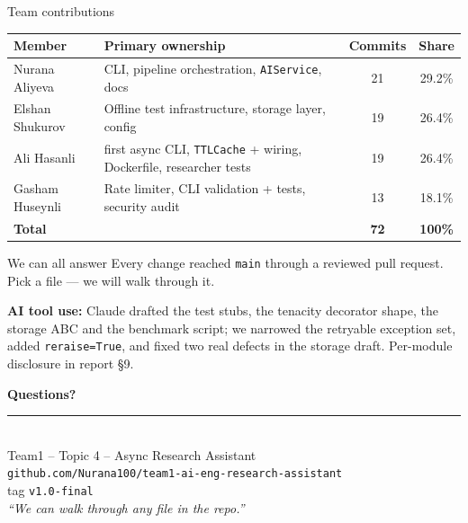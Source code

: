 \documentclass[aspectratio=169,11pt]{beamer}
\newcommand{\teamname}{Team1}
\newcommand{\topicchoice}{Topic 4 -- Async Research Assistant}
\newcommand{\memberone}{Nurana Aliyeva}
\newcommand{\membertwo}{Elshan Shukurov}
\newcommand{\memberthree}{Ali Hasanli}
\newcommand{\memberfour}{Gasham Huseynli}
\newcommand{\repolink}{github.com/Nurana100/team1-ai-eng-research-assistant}
\begin{document}
\begin{frame}{Team contributions}
  \begin{center}\footnotesize
  \begin{tabularx}{\linewidth}{lXcc}
    \toprule
    \textbf{Member} & \textbf{Primary ownership} & \textbf{Commits} & \textbf{Share} \\
    \midrule
    \memberone   & CLI, pipeline orchestration, \texttt{AIService}, docs & 21 & 29.2\% \\
    \membertwo   & Offline test infrastructure, storage layer, config & 19 & 26.4\% \\
    \memberthree & first async CLI, \texttt{TTLCache} + wiring, Dockerfile, researcher tests & 19 & 26.4\% \\
    \memberfour  & Rate limiter, CLI validation + tests, security audit & 13 & 18.1\% \\
    \midrule
    \textbf{Total} & & \textbf{72} & \textbf{100\%} \\
    \bottomrule
  \end{tabularx}
  \end{center}

  \vspace{0.2em}
  \begin{block}{We can all answer}
    \small Every change reached \texttt{main} through a reviewed pull request. Pick a file --- we
    will walk through it.
  \end{block}

  \vspace{0.1em}
  {\footnotesize\textbf{AI tool use:} Claude drafted the test stubs, the tenacity decorator shape,
  the storage ABC and the benchmark script; we narrowed the retryable exception set, added \texttt{reraise=True}, and
  fixed two real defects in the storage draft. Per-module disclosure in report \S9.}
\end{frame}

{%
\begin{frame}[plain]
  \begin{center}
    \vspace{0.8cm}
    {\Huge\bfseries\color{accent} Questions?}\\[1.0em]
    \rule{0.5\textwidth}{0.6pt}\\[1.0em]
    {\large \teamname{} -- \topicchoice}\\[0.5em]
    {\normalsize \texttt{\repolink}}\\[0.3em]
    {\footnotesize tag \texttt{v1.0-final}}\\[0.9cm]
    {\footnotesize\itshape ``We can walk through any file in the repo.''}
  \end{center}
\end{frame}
}
\end{document}
